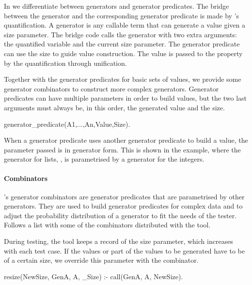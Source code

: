 In \plqc{} we differentiate between generators and generator
predicates.
%
The bridge between the generator and the corresponding generator
predicate is made by \plqc{}'s quantification.
%
A generator is any callable term that can generate a value given a
size parameter.
%
The bridge code calls the generator with two extra
arguments: the quantified variable and the current size parameter.
%
The generator predicate can use the size to guide value
construction.
%
The value is passed to the property by the \plqc{} quantification
through unification.


Together with the generator predicates for basic sets of values, we %
provide
some generator combinators to construct more complex
generators.
%
Generator predicates can have multiple parameters in order to build
values, but the two last arguments must always be, in this order, the
generated value and the size.
%
\begin{yapcode}
 generator_predicate(A1,...,An,Value,Size).
\end{yapcode}
%
When a generator predicate uses another generator predicate to build a
value, the parameter passed is in generator form.
%
This is shown in the example,
where the generator for lists, , is parametrised by a
generator for the integers.


\paragraph{\bf Combinators}

\plqc{}'s generator combinators are generator predicates that are
parametrised by other generators.
%
They are used to build generator predicates for complex data and to
adjust the probability distribution of a generator to fit the needs of
the tester.
%
Follows a list with some of the combinators distributed with the tool.


During testing, the tool keeps a record of the size parameter, which
increases with each test case.
%
If the values or part of the values to be generated have to be of a
certain size, we override this parameter with the 
combinator.
%
\begin{yapcode}
 resize(NewSize, GenA, A, _Size) :- call(GenA, A, NewSize).
\end{yapcode}


